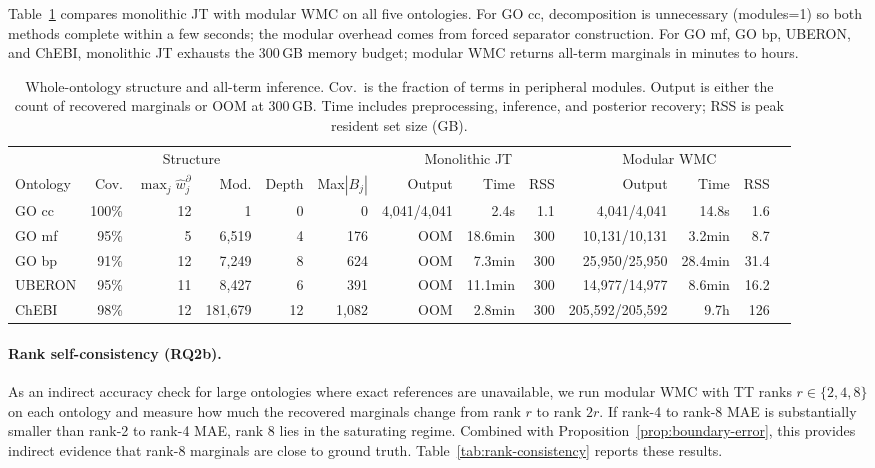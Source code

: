 \documentclass[12pt]{article}
\begin{document}
Table~\ref{tab:operational-scale} compares monolithic JT with modular
WMC on all five ontologies. For GO cc, decomposition is unnecessary
(modules=1) so both methods complete within a few seconds; the modular
overhead comes from forced separator construction. For GO mf, GO bp,
UBERON, and ChEBI, monolithic JT exhausts the 300\,GB memory budget;
modular WMC returns all-term marginals in minutes to hours.

\begin{table}[t]
\centering
\small
\setlength{\tabcolsep}{4pt}
\begin{tabular}{lrrrrrrrrrrrr}
\toprule
\multicolumn{6}{c}{Structure}
& \multicolumn{3}{c}{Monolithic JT}
& \multicolumn{3}{c}{Modular WMC} \\
\cmidrule(lr){1-6}\cmidrule(lr){7-9}\cmidrule(lr){10-12}
Ontology & Cov. & $\max_j\widehat{w}_j^\partial$
& Mod. & Depth & Max$|B_j|$
& Output & Time & RSS
& Output & Time & RSS \\
\midrule
GO cc   & 100\% & 12 & 1      & 0  & 0     & 4,041/4,041  & 2.4s    & 1.1 & 4,041/4,041   & 14.8s   & 1.6  \\
GO mf   & 95\%  & 5  & 6,519  & 4  & 176   & OOM          & 18.6min & 300 & 10,131/10,131 & 3.2min  & 8.7  \\
GO bp   & 91\%  & 12 & 7,249  & 8  & 624   & OOM          & 7.3min  & 300 & 25,950/25,950 & 28.4min & 31.4 \\
UBERON  & 95\%  & 11 & 8,427  & 6  & 391   & OOM          & 11.1min & 300 & 14,977/14,977 & 8.6min  & 16.2 \\
ChEBI   & 98\%  & 12 & 181,679& 12 & 1,082 & OOM          & 2.8min  & 300 & 205,592/205,592& 9.7h  & 126  \\
\bottomrule
\end{tabular}
\caption{Whole-ontology structure and all-term inference. Cov.\ is the
fraction of terms in peripheral modules. Output is either the count of
recovered marginals or OOM at 300\,GB. Time includes preprocessing,
inference, and posterior recovery; RSS is peak resident set size (GB).}
\label{tab:operational-scale}
\end{table}

\paragraph{Rank self-consistency (RQ2b).}
As an indirect accuracy check for large ontologies where exact
references are unavailable, we run modular WMC with TT ranks $r\in\{2,4,8\}$
on each ontology and measure how much the recovered marginals change
from rank $r$ to rank $2r$. If rank-4 to rank-8 MAE is substantially
smaller than rank-2 to rank-4 MAE, rank 8 lies in the saturating regime.
Combined with Proposition~\ref{prop:boundary-error}, this provides
indirect evidence that rank-8 marginals are close to ground truth.
Table~\ref{tab:rank-consistency} reports these results.
\end{document}
